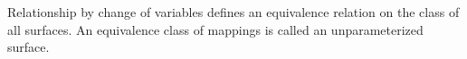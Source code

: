 Relationship by change of variables defines an equivalence relation on the class of all surfaces. An equivalence class of mappings is called an unparameterized surface.

